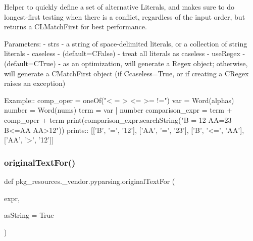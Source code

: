 \begin{DoxyVerb}Helper to quickly define a set of alternative Literals, and makes sure to do
longest-first testing when there is a conflict, regardless of the input order,
but returns a C{L{MatchFirst}} for best performance.

Parameters:
 - strs - a string of space-delimited literals, or a collection of string literals
 - caseless - (default=C{False}) - treat all literals as caseless
 - useRegex - (default=C{True}) - as an optimization, will generate a Regex
      object; otherwise, will generate a C{MatchFirst} object (if C{caseless=True}, or
      if creating a C{Regex} raises an exception)

Example::
    comp_oper = oneOf("< = > <= >= !=")
    var = Word(alphas)
    number = Word(nums)
    term = var | number
    comparison_expr = term + comp_oper + term
    print(comparison_expr.searchString("B = 12  AA=23 B<=AA AA>12"))
prints::
    [['B', '=', '12'], ['AA', '=', '23'], ['B', '<=', 'AA'], ['AA', '>', '12']]
\end{DoxyVerb}
 \mbox{\label{namespacepkg__resources_1_1__vendor_1_1pyparsing_ad9d9ecdbe20991956a6ca594da564a96}} 
\subsubsection{\texorpdfstring{original\+Text\+For()}{originalTextFor()}}
{\footnotesize\ttfamily def pkg\+\_\+resources.\+\_\+vendor.\+pyparsing.\+original\+Text\+For (\begin{DoxyParamCaption}\item[{}]{expr,  }\item[{}]{as\+String = {\ttfamily True} }\end{DoxyParamCaption})}

